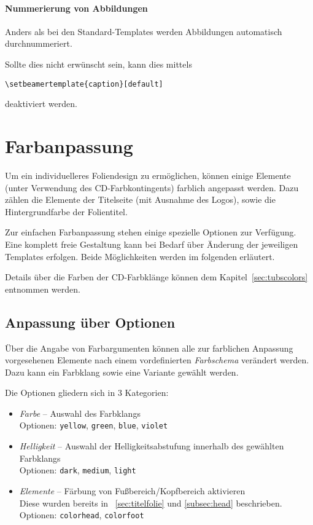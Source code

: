 \paragraph{Nummerierung von Abbildungen}

Anders als bei den Standard-Templates werden Abbildungen
automatisch durchnummeriert.

Sollte dies nicht erwünscht sein, kann dies mittels
\begin{lstlisting}
\setbeamertemplate{caption}[default]
\end{lstlisting}
deaktiviert werden.

\section{Farbanpassung}\label{beamer:sec:color}

Um ein individuelleres Foliendesign zu ermöglichen, können einige Elemente
(unter Verwendung des CD-Farbkontingents)
farblich angepasst werden.
Dazu zählen die Elemente der Titelseite (mit Ausnahme des Logos),
sowie die Hintergrundfarbe der Folientitel.

Zur einfachen Farbanpassung stehen einige spezielle Optionen zur Verfügung.
Eine komplett freie Gestaltung kann bei Bedarf über Änderung der
jeweiligen Templates erfolgen. Beide Möglichkeiten werden im folgenden
erläutert.

Details über die Farben der CD-Farbklänge können dem
Kapitel~\ref{sec:tubscolors} entnommen werden.

\subsection{Anpassung über Optionen}

Über die Angabe von Farbargumenten können alle zur farblichen Anpassung
vorgesehenen Elemente nach einem vordefinierten \emph{Farbschema}
verändert werden.
Dazu kann ein Farbklang sowie eine Variante gewählt werden.

Die Optionen gliedern sich in 3 Kategorien:
\begin{itemize}
  \item \emph{Farbe} -- Auswahl des Farbklangs\\
    Optionen: \texttt{yellow}, \texttt{green}, \texttt{blue}, \texttt{violet}
  \item \emph{Helligkeit} -- Auswahl der Helligkeitsabstufung
    innerhalb des gewählten Farbklangs\\
    Optionen: \texttt{dark}, \texttt{medium}, \texttt{light}
  \item \emph{Elemente} -- Färbung von Fußbereich/Kopfbereich aktivieren\\
    Diese wurden bereits in \chaptername~\ref{sec:titelfolie} und \ref{subsec:head} beschrieben.\\
    Optionen: \texttt{colorhead}, \texttt{colorfoot}
\end{itemize}

